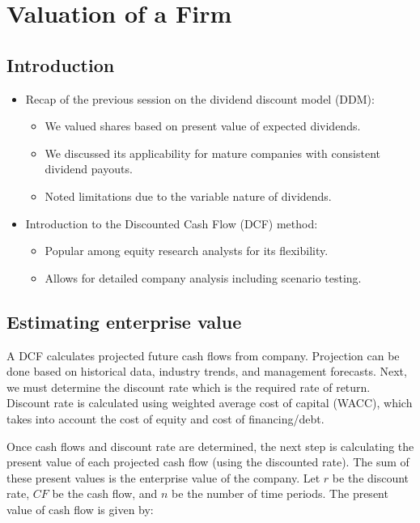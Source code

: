 \chapter{Valuation of a Firm}

\section{Introduction}
\begin{itemize}
    \item Recap of the previous session on the dividend discount model (DDM):
      \begin{itemize}
        \item We valued shares based on present value of expected dividends.
        \item We discussed its applicability for mature companies with consistent dividend payouts.
        \item Noted limitations due to the variable nature of dividends.
      \end{itemize}
    \item Introduction to the Discounted Cash Flow (DCF) method:
      \begin{itemize}
        \item Popular among equity research analysts for its flexibility.
        \item Allows for detailed company analysis including scenario testing.
      \end{itemize}
  \end{itemize}

\section{Estimating enterprise value}
A DCF calculates projected future cash flows from company. Projection can be done based on historical data, industry trends, and management forecasts. Next, we must determine the discount rate which is the required rate of return.\\

Discount rate is calculated using weighted average cost of capital (WACC), which takes into account the cost of equity and cost of financing/debt.

Once cash flows and discount rate are determined, the next step is calculating the present value of each projected cash flow (using the discounted rate). The sum of these present values is the enterprise value of the company. Let $r$ be the discount rate, $CF$ be the cash flow, and $n$ be the number of time periods. The present value of cash flow is given by:

